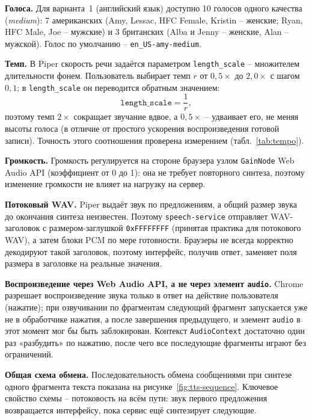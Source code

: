 \textbf{Голоса.} Для варианта~1 (английский язык) доступно 10 голосов
одного качества (\emph{medium}): 7 американских
(Amy, Lessac, HFC Female, Kristin -- женские; Ryan, HFC Male, Joe --
мужские) и 3 британских (Alba и Jenny -- женские, Alan -- мужской).
Голос по умолчанию -- \texttt{en\_US-amy-medium}.

\textbf{Темп.} В Piper скорость речи задаётся параметром
\texttt{length\_scale} -- множителем длительности фонем. Пользователь
выбирает темп $r$ от $0{,}5\times$ до $2{,}0\times$ с шагом $0{,}1$;
в \texttt{length\_scale} он переводится обратным значением:
\begin{equation}
  \texttt{length\_scale} = \frac{1}{r},
\end{equation}
поэтому темп $2\times$ сокращает звучание вдвое, а $0{,}5\times$ --
удваивает его, не меняя высоты голоса (в отличие от простого
ускорения воспроизведения готовой записи). Точность этого соотношения
проверена измерением (табл.~\ref{tab:tempo}).

\textbf{Громкость.} Громкость регулируется на стороне браузера узлом
\texttt{GainNode} Web Audio API (коэффициент от 0 до 1): она не требует
повторного синтеза, поэтому изменение громкости не влияет на нагрузку
на сервер.

\textbf{Потоковый WAV.} Piper выдаёт звук по предложениям, а общий
размер звука до окончания синтеза неизвестен. Поэтому
\texttt{speech-service} отправляет WAV-заголовок с размером-заглушкой
\texttt{0xFFFFFFFF} (принятая практика для потокового WAV), а затем
блоки PCM по мере готовности. Браузеры не всегда корректно
декодируют такой заголовок, поэтому интерфейс, получив ответ, заменяет
поля размера в заголовке на реальные значения.

\textbf{Воспроизведение через Web Audio API, а не через элемент
\texttt{audio}.} Chrome разрешает воспроизведение звука только в
ответ на действие пользователя (нажатие); при озвучивании по
фрагментам следующий фрагмент запускается уже не в обработчике нажатия,
а после завершения предыдущего, и элемент \texttt{audio} в этот
момент мог бы быть заблокирован. Контекст \texttt{AudioContext}
достаточно один раз «разбудить» по нажатию, после чего все
последующие фрагменты играют без ограничений.


\textbf{Общая схема обмена.} Последовательность обмена сообщениями при
синтезе одного фрагмента текста показана на
рисунке~\ref{fig:tts-sequence}. Ключевое свойство схемы -- потоковость
на всём пути: звук первого предложения возвращается интерфейсу,
пока сервис ещё синтезирует следующие.

